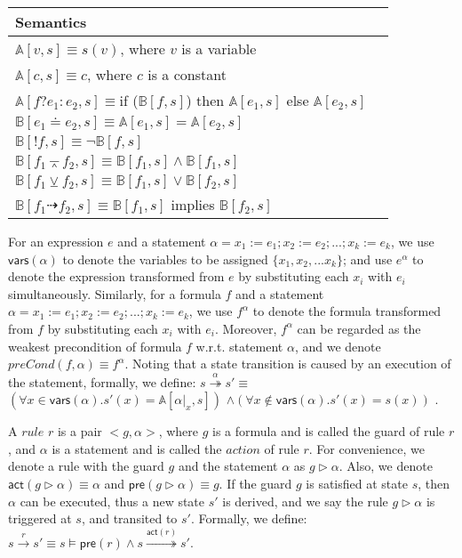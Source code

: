 \documentclass[final]{IEEEtran}
\def \andc {\barwedge }
\def \negc {!}
\def \orc {\veebar }
\begin{document}
\begin{table}[h] \label{table-semantics-exp-formula}
\center\begin{tabular}{|l|l|}
  \hline
   Semantics \\ \hline
  $\mathbb{A}[v,s]\equiv s(v)$, where  $v$ is a variable\\
    $\mathbb{A}[c,s]\equiv c$, where  $c$ is a constant\\
   $\mathbb{A}[f?e_1:e_2,s]\equiv$if ($\mathbb{B}[f,s]$) then $\mathbb{A}[e_1,s]$ else $\mathbb{A}[e_2,s]$ \\
  $\mathbb{B}[ e_1\doteq e_2,s]\equiv   \mathbb{A}[e_1,s]=\mathbb{A}[e_2,s]$  \\
  $\mathbb{B}[\negc f,s]\equiv \neg \mathbb{B}[f,s]$ \\
  $\mathbb{B}[f_1\andc f_2,s]\equiv \mathbb{B}[f_1,s] \land \mathbb{B}[f_1,s]$ \\
  $\mathbb{B}[f_1\orc f_2,s]\equiv \mathbb{B}[f_1,s] \vee \mathbb{B}[f_2,s]$ \\
 $\mathbb{B}[f_1\dashrightarrow f_2,s]\equiv \mathbb{B}[f_1,s]$  implies $\mathbb{B}[f_2,s]$ \\
  \hline
\end{tabular}
\end{table}


For an expression $e$ and a statement $\alpha= x_1:=e_1;x_2:=e_2;...;x_k:=e_k $, we use $\mathsf{vars(\alpha)}$ to denote the variables to be assigned $\{x_1,x_2,...x_k\}$; and use $e^{\alpha}$ to denote the expression transformed from $e$ by substituting each $x_i$ with $e_i$ simultaneously.
Similarly, for a formula $f$  and a statement $\alpha= x_1:=e_1;x_2:=e_2;...;x_k:=e_k $, we use $f^{\alpha}$ to denote the formula transformed from $f$ by substituting each $x_i$ with $e_i$.
Moreover, $f^{\alpha}$ can be regarded as the weakest precondition of formula $f$ w.r.t. statement $\alpha$, and we denote $preCond(f,\alpha)\equiv f^{\alpha}$. Noting that a state transition is caused by an execution of the statement, formally, we define: $s\overset{\alpha}{\twoheadrightarrow } s' \equiv$ $(\forall x \in \mathsf{vars}(\alpha). s'(x)= \mathbb{A}[\alpha|_x,s])$ $\wedge (\forall x \notin \mathsf{vars}(\alpha). s'(x)= s(x))$ .

A $rule$ $r$ is a pair $<g,\alpha>$, where $g$ is a formula and is called the guard of rule $r$, and $\alpha$ is a statement and is called the $action$ of rule $r$.
 For convenience, we denote a rule with the guard $g$ and the statement $\alpha$ as $g \vartriangleright \alpha$. Also, we denote $\mathsf{act}(g \vartriangleright \alpha)\equiv \alpha$ and $\mathsf{pre}(g \vartriangleright \alpha)\equiv g$. If the guard $g$ is satisfied at state $s$, then $\alpha$ can be executed, thus a new state $s'$ is derived, and we say the rule $g \vartriangleright \alpha$ is triggered at $s$, and transited to $s'$. Formally, we define: $s\overset{r}{\rightarrow } s' \equiv s\models \mathsf{pre}(r) \wedge s\overset{\mathsf{act}(r)}{\twoheadrightarrow } s'$.
\end{document}
